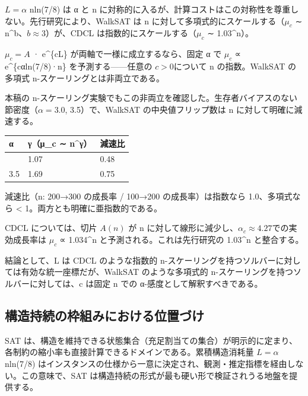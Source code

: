 \documentclass[12pt,a4paper]{article}
\begin{document}
\(L = \alpha\) n\textbar ln(7/8)\textbar{} は α と n に対称的に入るが、計算コストはこの対称性を尊重しない。先行研究により、WalkSAT は n に対して多項式的にスケールする（\(\mu_{c}\) ∼ n\^{}b、\(b ≈ 3\)）が、CDCL は指数的にスケールする（\(\mu_{c}\) ∼ 1.03\^{}n）。

\(\mu_{c} = A\) · e\^{}\{cL\} が両軸で一様に成立するなら、固定 α で \(\mu_{c}\) ∝ e\^{}\{cα\textbar ln(7/8)\textbar·n\} を予測する------任意の \(c > 0\)について n の指数。WalkSAT の多項式 n-スケーリングとは非両立である。

本稿の n-スケーリング実験でもこの非両立を確認した。生存者バイアスのない節密度（\(\alpha = 3.0\), 3.5）で、WalkSAT の中央値フリップ数は n に対して明確に減速する。

{\def\LTcaptype{table} %
\begin{longtable}[]{@{}lll@{}}
\toprule\noalign{}
α & γ（μ\_c ∼ n\^{}γ） & 減速比 \\
\midrule\noalign{}
\endhead
\bottomrule\noalign{}
\endlastfoot
3.0 & 1.07 & 0.48 \\
3.5 & 1.69 & 0.75 \\
\end{longtable}
}

減速比（n: 200→300 の成長率 / 100→200 の成長率）は指数なら 1.0、多項式なら \textless{} 1。両方とも明確に亜指数的である。

CDCL については、切片 \(A(n)\) が n に対して線形に減少し、\(\alpha_{c} ≈ 4.27\)での実効成長率は \(\mu_{c}\) ∝ 1.034\^{}n と予測される。これは先行研究の 1.03\^{}n と整合する。

結論として、L は CDCL のような指数的 n-スケーリングを持つソルバーに対しては有効な統一座標だが、WalkSAT のような多項式的 n-スケーリングを持つソルバーに対しては、c は固定 n での α-感度として解釈すべきである。

\subsection{構造持続の枠組みにおける位置づけ}\label{ux69cbux9020ux6301ux7d9aux306eux67a0ux7d44ux307fux306bux304aux3051ux308bux4f4dux7f6eux3065ux3051}

SAT は、構造を維持できる状態集合（充足割当ての集合）が明示的に定まり、各制約の縮小率も直接計算できるドメインである。累積構造消耗量 \(L = \alpha\) n\textbar ln(7/8)\textbar{} はインスタンスの仕様から一意に決定され、観測・推定指標を経由しない。この意味で、SAT は構造持続の形式が最も硬い形で検証されうる地盤を提供する。
\end{document}
